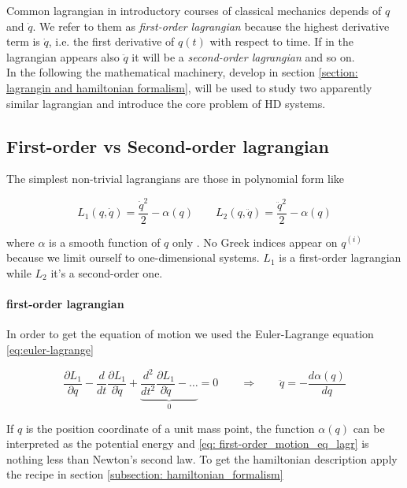 Common lagrangian in introductory courses of classical mechanics depends of $q$
and $\dot{q}$. We refer to them as \emph{first-order lagrangian} because the
highest derivative term is $\dot{q}$, i.e. the first derivative of $q(t)$ with
respect to time. If in the lagrangian appears also $\ddot{q}$ it will be a
\emph{second-order lagrangian} and so on. \\

In the following the mathematical machinery, develop in section \ref{section:
lagrangin and hamiltonian formalism}, will be used to study two apparently
similar lagrangian and introduce the core problem of HD systems.

\subsection{First-order vs Second-order lagrangian}
The simplest non-trivial lagrangians are those in polynomial form like

\begin{equation*}
  L_1(q, \dot{q}) = \frac{\dot{q}^2}{2} - \alpha(q) \qquad
  L_2(q, \ddot{q}) = \frac{\ddot{q}^2}{2} - \alpha(q)
\end{equation*}

where $\alpha$ is a smooth function of $q$ only \cite{Chen13}. No Greek indices
appear on $q^{(i)}$ because we limit ourself to one-dimensional systems. $L_1$
is a first-order lagrangian while $L_2$ it's a second-order one.


\paragraph{first-order lagrangian} In order to get the equation of motion we
used the Euler-Lagrange equation \eqref{eq:euler-lagrange}

\begin{equation} \label{eq: first-order_motion_eq_lagr}
  \frac{\partial L_1}{\partial q} -
  \frac{d}{dt}\frac{\partial L_1}{\partial \dot{q}} +
  \underbrace{
  \frac{d^2}{dt^2}\frac{\partial L_1}{\partial \ddot{q}} - \ldots }_0 = 0
  \qquad \Rightarrow \qquad
  \ddot{q} = - \frac{d\alpha(q)}{dq}
\end{equation}

If $q$ is the position coordinate of a unit mass point, the function $\alpha(q)$
can be interpreted as the potential energy and \eqref{eq:
first-order_motion_eq_lagr} is nothing less than Newton's second law. To get the
hamiltonian description apply the recipe in section \ref{subsection:
hamiltonian_formalism}

